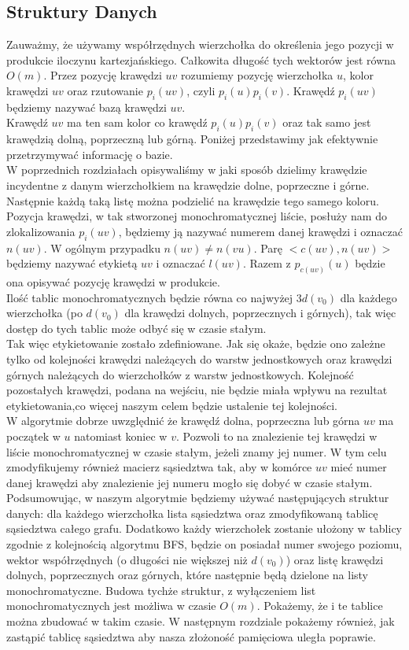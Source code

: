 \documentclass[12pt,a4paper,titlepage]{article}
\begin{document}
\subsection{Struktury Danych}
Zauważmy, że używamy współrzędnych wierzchołka do określenia jego pozycji w produkcie iloczynu kartezjańskiego. Całkowita długość tych wektorów jest równa $O(m)$. Przez pozycję krawędzi $uv$ rozumiemy pozycję wierzchołka $u$, kolor krawędzi $uv$ oraz rzutowanie $p_i (uv)$, czyli $p_i(u) p_i(v)$. Krawędź $p_i (uv)$ będziemy nazywać bazą krawędzi $uv$. \\
Krawędź $uv$ ma ten sam kolor co krawędź $p_i (u)p_i(v)$ oraz tak samo jest krawędzią dolną, poprzeczną lub górną. Poniżej przedstawimy jak efektywnie przetrzymywać informację o bazie. \\
W poprzednich rozdziałach opisywaliśmy w jaki sposób dzielimy krawędzie incydentne z danym wierzchołkiem na krawędzie dolne, poprzeczne i górne. Następnie każdą taką listę można podzielić na krawędzie tego samego koloru. Pozycja krawędzi, w tak stworzonej monochromatycznej liście, posłuży nam do zlokalizowania $p_i(uv)$, będziemy ją nazywać numerem danej krawędzi i oznaczać $n(uv)$. W ogólnym przypadku $n(uv) \neq n(vu)$. Parę $<c(uv), n(uv)>$ będziemy nazywać etykietą $uv$ i oznaczać $l(uv)$. Razem z $p_{c(uv)}(u)$ będzie ona opisywać pozycję krawędzi w produkcie. \\
Ilość tablic monochromatycznych będzie równa co najwyżej $3d(v_0 )$ dla każdego wierzchołka (po $d(v_0)$ dla krawędzi dolnych, poprzecznych i górnych), tak więc dostęp do tych tablic może odbyć się w czasie stałym.\\
Tak więc etykietowanie zostało zdefiniowane. Jak się okaże, będzie ono zależne tylko od kolejności krawędzi należących do warstw jednostkowych oraz krawędzi górnych należących do wierzchołków z warstw jednostkowych. Kolejność pozostałych krawędzi, podana na wejściu, nie będzie miała wpływu na rezultat etykietowania,co więcej naszym celem będzie ustalenie tej kolejności. \\
W algorytmie dobrze uwzględnić że krawędź dolna, poprzeczna lub górna $uv$ ma początek w $u$ natomiast koniec w $v$. Pozwoli to na znalezienie tej krawędzi w liście monochromatycznej w czasie stałym, jeżeli znamy jej numer. W tym celu zmodyfikujemy również macierz sąsiedztwa tak, aby w komórce $uv$ mieć numer danej krawędzi aby znalezienie jej numeru mogło się dobyć w czasie stałym. \\
Podsumowując, w naszym algorytmie będziemy używać następujących struktur danych: dla każdego wierzchołka lista sąsiedztwa oraz zmodyfikowaną tablicę sąsiedztwa całego grafu. Dodatkowo każdy wierzchołek zostanie ułożony w tablicy zgodnie z kolejnością algorytmu BFS, będzie on posiadał numer swojego poziomu, wektor współrzędnych (o długości nie większej niż $d(v_0)$) oraz listę krawędzi dolnych, poprzecznych oraz górnych, które następnie będą dzielone na listy monochromatyczne. Budowa tychże struktur, z wyłączeniem list monochromatycznych jest możliwa w czasie $O(m)$. Pokażemy, że i te tablice można zbudować w takim czasie. W następnym rozdziale pokażemy również, jak zastąpić tablicę sąsiedztwa aby nasza złożoność pamięciowa uległa poprawie. \\
\\
\end{document}

